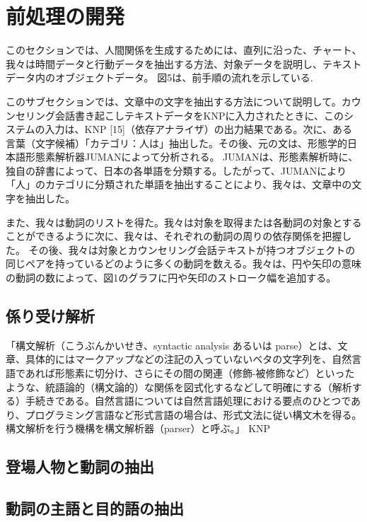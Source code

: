 \documentclass[shuuron]{kuee}
\begin{document}
\section{前処理の開発}

  このセクションでは、人間関係を生成するためには、直列に沿った、チャート、我々は時間データと行動データを抽出する方法、対象データを説明し、テキストデータ内のオブジェクトデータ。 図5は、前手順の流れを示している.

  このサブセクションでは、文章中の文字を抽出する方法について説明して。カウンセリング会話書き起こしテキストデータをKNPに入力されたときに、このシステムの入力は、KNP [15]（依存アナライザ）の出力結果である。次に、ある言葉（文字候補）「カテゴリ：人は」抽出した。その後、元の文は、形態学的日本語形態素解析器JUMAN\cite{juman}によって分析される。 JUMANは、形態素解析時に、独自の辞書によって、日本の各単語を分類する。したがって、JUMANにより「人」のカテゴリに分類された単語を抽出することにより、我々は、文章中の文字を抽出した。

  また、我々は動詞のリストを得た。我々は対象を取得または各動詞の対象とすることができるように次に、我々は、それぞれの動詞の周りの依存関係を把握した。
  その後、我々は対象とカウンセリング会話テキストが持つオブジェクトの同じペアを持っているどのように多くの動詞を数える。我々は、円や矢印の意味の動詞の数によって、図1のグラフに円や矢印のストローク幅を追加する。


  \subsection{係り受け解析}


「構文解析（こうぶんかいせき、syntactic analysis あるいは parse）とは、文章、具体的にはマークアップなどの注記の入っていないベタの文字列を、自然言語であれば形態素に切分け、さらにその間の関連（修飾-被修飾など）といったような、統語論的（構文論的）な関係を図式化するなどして明確にする（解析する）手続きである。自然言語については自然言語処理における要点のひとつであり、プログラミング言語など形式言語の場合は、形式文法に従い構文木を得る。構文解析を行う機構を構文解析器（parser）と呼ぶ。」
  KNP


  \subsection{登場人物と動詞の抽出}


  \subsection{動詞の主語と目的語の抽出}
\end{document}
